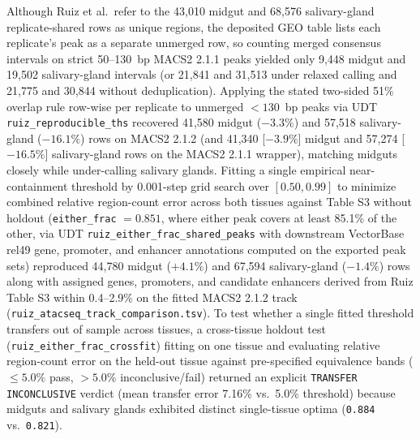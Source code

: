 \documentclass[11pt,letterpaper]{article}
\newcommand{\tool}[1]{\textsf{#1}}
\begin{document}
Although Ruiz et al.\ refer to the 43,010 midgut and 68,576 salivary-gland replicate-shared rows as unique regions, the deposited GEO table lists each replicate's peak as a separate unmerged row, so counting merged consensus intervals on strict 50--130~bp \tool{MACS2} 2.1.1 peaks yielded only 9,448 midgut and 19,502 salivary-gland intervals (or 21,841 and 31,513 under relaxed calling and 21,775 and 30,844 without deduplication). Applying the stated two-sided 51\% overlap rule row-wise per replicate to unmerged $< 130$~bp peaks via UDT \nolinkurl{ruiz_reproducible_ths} recovered 41,580 midgut ($-3.3\%$) and 57,518 salivary-gland ($-16.1\%$) rows on \tool{MACS2} 2.1.2 (and 41,340 [$-3.9\%$] midgut and 57,274 [$-16.5\%$] salivary-gland rows on the \tool{MACS2} 2.1.1 wrapper), matching midguts closely while under-calling salivary glands. Fitting a single empirical near-containment threshold by 0.001-step grid search over $[0.50, 0.99]$ to minimize combined relative region-count error across both tissues against Table S3 without holdout (\texttt{either\_frac} $= 0.851$, where either peak covers at least 85.1\% of the other, via UDT \nolinkurl{ruiz_either_frac_shared_peaks} with downstream VectorBase rel49 gene, promoter, and enhancer annotations computed on the exported peak sets) reproduced 44,780 midgut ($+4.1\%$) and 67,594 salivary-gland ($-1.4\%$) rows along with assigned genes, promoters, and candidate enhancers derived from Ruiz Table S3 within 0.4--2.9\% on the fitted \tool{MACS2} 2.1.2 track (\nolinkurl{ruiz_atacseq_track_comparison.tsv}). To test whether a single fitted threshold transfers out of sample across tissues, a cross-tissue holdout test (\nolinkurl{ruiz_either_frac_crossfit}) fitting on one tissue and evaluating relative region-count error on the held-out tissue against pre-specified equivalence bands ($\le 5.0\%$ pass, $> 5.0\%$ inconclusive/fail) returned an explicit \texttt{TRANSFER INCONCLUSIVE} verdict (mean transfer error 7.16\% vs.\ 5.0\% threshold) because midguts and salivary glands exhibited distinct single-tissue optima (\texttt{0.884} vs.\ \texttt{0.821}).
\end{document}
